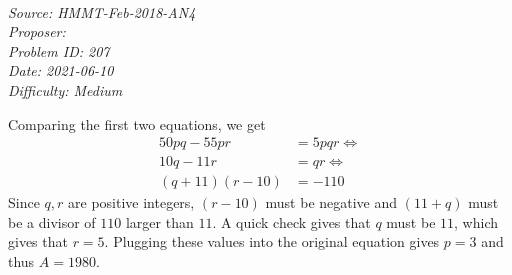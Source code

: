 \SSbreak\\
\emph{Source: HMMT-Feb-2018-AN4}\\
\emph{Proposer: \Pchan}\\ %
\emph{Problem ID: 207}\\
\emph{Date: 2021-06-10}\\
\emph{Difficulty: Medium}\\
\SSbreak
 
\bigskip

\begin{solution}\hfil\medskip
Comparing the first two equations, we get 
\begin{align*}
    50pq - 55pr &= 5pqr \iff \\
    10q - 11r &= qr \iff \\
    (q+11)(r-10) &= -110 
\end{align*}
Since $q,r$ are positive integers, $(r-10)$ must be negative and $(11+q)$ must be a divisor of $110$ larger than $11$. A quick check gives that $q$ must be $11$, which gives that $r = 5$. Plugging these values into the original equation gives $p = 3$ and thus $A = \boxed{1980}$.

\end{solution}\bigskip
